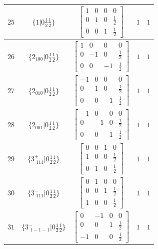 \documentclass[fleqn,8pt]{jsarticle}
\begin{document}
\begin{longtable}{ccccc}
$ 25 $ & $ \{1|0 \frac{1}{2} \frac{1}{2}\} $ & $ \begin{bmatrix} 1 & 0 & 0 & 0 \\ 0 & 1 & 0 & \frac{1}{2} \\ 0 & 0 & 1 & \frac{1}{2} \end{bmatrix} $ & $ 1 $ & $ 1 $ \\ \hline
$ 26 $ & $ \{2{}_{100}|0 \frac{1}{2} \frac{1}{2}\} $ & $ \begin{bmatrix} 1 & 0 & 0 & 0 \\ 0 & -1 & 0 & \frac{1}{2} \\ 0 & 0 & -1 & \frac{1}{2} \end{bmatrix} $ & $ 1 $ & $ 1 $ \\ \hline
$ 27 $ & $ \{2{}_{010}|0 \frac{1}{2} \frac{1}{2}\} $ & $ \begin{bmatrix} -1 & 0 & 0 & 0 \\ 0 & 1 & 0 & \frac{1}{2} \\ 0 & 0 & -1 & \frac{1}{2} \end{bmatrix} $ & $ 1 $ & $ 1 $ \\ \hline
$ 28 $ & $ \{2{}_{001}|0 \frac{1}{2} \frac{1}{2}\} $ & $ \begin{bmatrix} -1 & 0 & 0 & 0 \\ 0 & -1 & 0 & \frac{1}{2} \\ 0 & 0 & 1 & \frac{1}{2} \end{bmatrix} $ & $ 1 $ & $ 1 $ \\ \hline
$ 29 $ & $ \{3^{+}_{\,\,111}|0 \frac{1}{2} \frac{1}{2}\} $ & $ \begin{bmatrix} 0 & 0 & 1 & 0 \\ 1 & 0 & 0 & \frac{1}{2} \\ 0 & 1 & 0 & \frac{1}{2} \end{bmatrix} $ & $ 1 $ & $ 1 $ \\ \hline
$ 30 $ & $ \{3^{-}_{\,\,111}|0 \frac{1}{2} \frac{1}{2}\} $ & $ \begin{bmatrix} 0 & 1 & 0 & 0 \\ 0 & 0 & 1 & \frac{1}{2} \\ 1 & 0 & 0 & \frac{1}{2} \end{bmatrix} $ & $ 1 $ & $ 1 $ \\ \hline
$ 31 $ & $ \{3^{-}_{\,\,1-1-1}|0 \frac{1}{2} \frac{1}{2}\} $ & $ \begin{bmatrix} 0 & -1 & 0 & 0 \\ 0 & 0 & 1 & \frac{1}{2} \\ -1 & 0 & 0 & \frac{1}{2} \end{bmatrix} $ & $ 1 $ & $ 1 $ \\ \hline

\end{longtable}
\end{document}

